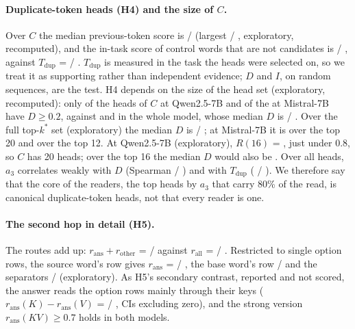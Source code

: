 \paragraph{Duplicate-token heads (H4) and the size of $C$.} Over $C$ the median previous-token score is \HcPrevOptQwenSeven{} / \HcPrevOptMistralSeven{} (largest \HfourPrevMaxQwenSeven{} / \HfourPrevMaxMistralSeven{}, exploratory, recomputed), and the in-task score of control words that are not candidates is \HcTctrlOptQwenSeven{} / \HcTctrlOptMistralSeven{}, against $T_{\mathrm{dup}}$ = \HfourTQwenSeven{} / \HfourTMistralSeven{}. $T_{\mathrm{dup}}$ is measured in the task the heads were selected on, so we treat it as supporting rather than independent evidence; $D$ and $I$, on random sequences, are the test. H4 depends on the size of the head set (exploratory, recomputed): only \HfourNDgeQwenSeven{} of the \HfourKCQwenSeven{} heads of $C$ at Qwen2.5-7B and \HfourNDgeMistralSeven{} of the \HfourKCMistralSeven{} at Mistral-7B have $D \geq 0.2$, against \HfourNDgeWholeQwenSeven{} and \HfourNDgeWholeMistralSeven{} in the whole model, whose median $D$ is \HfourDwholeQwenSeven{} / \HfourDwholeMistralSeven{}. Over the full top-$k^*$ set (exploratory) the median $D$ is \HfourDkstarQwenSeven{} / \HfourDkstarMistralSeven{}; at Mistral-7B it is \HfourDtopTwentyMistralSeven{} over the top 20 and \HfourDtopTwelveMistralSeven{} over the top 12. At Qwen2.5-7B (exploratory), $R(16)$ = \HoneRsixteenQwenSeven{}, just under 0.8, so $C$ has 20 heads; over the top 16 the median $D$ would also be \HfourDtopSixteenQwenSeven{}. Over all heads, $a_3$ correlates weakly with $D$ (Spearman \HfourRhoDQwenSeven{} / \HfourRhoDMistralSeven{}) and with $T_{\mathrm{dup}}$ (\HfourRhoTQwenSeven{} / \HfourRhoTMistralSeven{}). We therefore say that the core of the readers, the top heads by $a_3$ that carry 80\% of the read, is canonical duplicate-token heads, not that every reader is one.

\paragraph{The second hop in detail (H5).} The routes add up: $r_{\mathrm{ans}} + r_{\mathrm{other}}$ = \HhopSumOptQwenSeven{} / \HhopSumOptMistralSeven{} against $r_{\mathrm{all}}$ = \HfiveAllQwenSeven{} / \HfiveAllMistralSeven{}. Restricted to single option rows, the source word's row gives $r_{\mathrm{ans}}$ = \HhoprowRowsAnsKVOptQwenSeven{} / \HhoprowRowsAnsKVOptMistralSeven{}, the base word's row \HhoprowRowbAnsKVOptQwenSeven{} / \HhoprowRowbAnsKVOptMistralSeven{} and the separators \HhoprowSepAnsKVOptQwenSeven{} / \HhoprowSepAnsKVOptMistralSeven{} (exploratory). As H5's secondary contrast, reported and not scored, the answer reads the option rows mainly through their keys ($r_{\mathrm{ans}}(K) - r_{\mathrm{ans}}(V)$ = \HfiveKminusVQwenSeven{} / \HfiveKminusVMistralSeven{}, CIs excluding zero), and the strong version $r_{\mathrm{ans}}(KV) \geq 0.7$ holds in both models.

